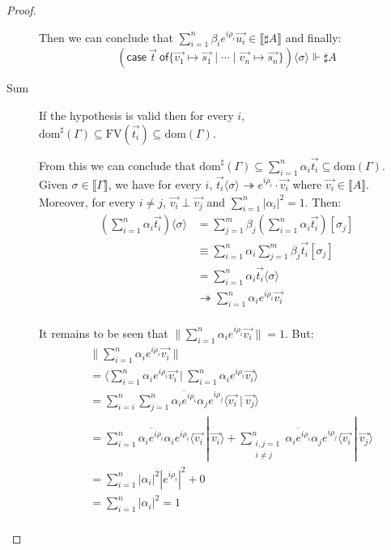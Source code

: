 \documentclass[runningheads,orivec]{llncs}
\newcommand\ansubst[2]{\ensuremath{\langle #1 \rangle_{#2}}}
\newcommand\dom[1]{\mathrm{dom}(#1)}
\newcommand\sdom[1]{\mathrm{dom}^{\sharp}(#1)}
\newcommand\FV[1]{\mathrm{FV}(#1)}
\def\scal#1#2{\langle{#1}~|~{#2}\rangle}
\def\gencase#1#2#3#4#5{\ensuremath{\mathsf{case}~#1~\mathsf{of} \{#2\mapsto #4 \mid \dotsb \mid #3\mapsto #5\}}}
\def\eval{\twoheadrightarrow}
\def\sem#1{\llbracket#1\rrbracket}
\def\real{\Vdash}
\begin{document}
\begin{proof}
\begin{description}
    Then we can conclude that $\sum_{i=1}^{n}\beta_i e^{i\rho_i}\vec{u_i}\in\sem{\sharp A}$ and finally:
    \[
        (\gencase{\vec{t}}{\vec{v_1}}{\vec{v_n}}{\vec{s_1}}{\vec{s_n}})\ansubst{\sigma}{}\real\sharp A
    \]

    \item[Sum] If the hypothesis is valid then for every $i$, $\sdom{\Gamma}\subseteq\FV{\vec{t_i}}\subseteq\dom{\Gamma}$.
    
    From this we can conclude that $\sdom{\Gamma}\subseteq\sum_{i=1}^{n}\alpha_i \vec{t_i}\subseteq\dom{\Gamma}$. Given $\sigma\in\sem{\Gamma}$, we have for every $i$, $\vec{t_i}\ansubst{\sigma}{}\eval e^{i\rho_i}\cdot\vec{v_i}$ where $\vec{v_i}\in\sem{A}$. Moreover, for every $i\neq j$, $\vec{v_i}\perp\vec{v_j}$ and $\sum_{i=1}^{n}|\alpha_i|^2=1$. Then:
    \begin{align*}
    (\sum_{i=1}^{n}\alpha_i\vec{t_i})\ansubst{\sigma}{} 
    &= \sum_{j=1}^{m}\beta_j(\sum_{i=1}^{n}\alpha_i \vec{t_i})[\sigma_j]\\
    &\equiv \sum_{i=1}^{n} \alpha_i \sum_{j=1}^{m} \beta_j \vec{t_i}[\sigma_j]\\
    &=\sum_{i=1}^{n} \alpha_i \vec{t_i}\ansubst{\sigma}{}\\
    &\eval \sum_{i=1}^{n} \alpha_i e^{i\rho_i} \vec{v_i}\\
    \end{align*}

    It remains to be seen that $\|\sum_{i=1}^{n} \alpha_i e^{i\rho_i} \vec{v_i}\|=1$. But:
    \begin{align*}
    &\|\sum_{i=1}^{n} \alpha_i e^{i\rho_i} \vec{v_i}\| \\
    &=\scal{\sum_{i=1}^{n} \alpha_i e^{i\rho_i}\vec{v_i}}{\sum_{i=1}^{n} \alpha_i e^{i\rho_i} \vec{v_i}}\\
    &= \sum_{i=i}^{n}\sum_{j=1}^{n} \overline{\alpha_i e^{i\rho_i}}\alpha_j e^{i\rho_j} \scal{\vec{v_i}}{\vec{v_j}}\\
    &=\sum_{i=1}^{n} \overline{\alpha_i e^{i\rho_i}}\alpha_i e^{i\rho_i} \scal{\vec{v_i}}{\vec{v_i}} + \sum_{\substack{i,j=1\\i\neq j}}^{n} \overline{\alpha_i e^{i\rho_i}}\alpha_j e^{i\rho_j} \scal{\vec{v_i}}{\vec{v_j}}\\
    &=\sum_{i=1}^{n}|\alpha_i|^2 |e^{i\rho_i}|^2+ 0\\
    &=\sum_{i=1}^{n}|\alpha_i|^2 = 1\\
    \end{align*}


\end{description}
\end{proof}
\end{document}
